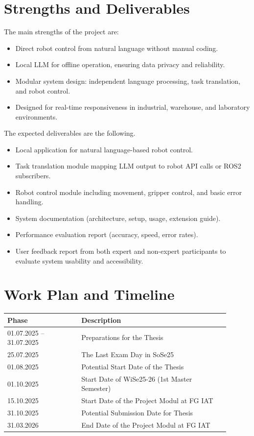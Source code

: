\documentclass[a4paper,11pt]{article}
\begin{document}
\newpage
\section{Strengths and Deliverables}

The main strengths of the project are:

\begin{itemize}
    \item Direct robot control from natural language without manual coding.
    \item Local LLM for offline operation, ensuring data privacy and reliability.
    \item Modular system design: independent language processing, task translation, and robot control.
    \item Designed for real-time responsiveness in industrial, warehouse, and laboratory environments.
\end{itemize}

The expected deliverables are the following.

\begin{itemize}
    \item Local application for natural language-based robot control.
    \item Task translation module mapping LLM output to robot API calls or ROS2 subscribers.
    \item Robot control module including movement, gripper control, and basic error handling.
    \item System documentation (architecture, setup, usage, extension guide).
    \item Performance evaluation report (accuracy, speed, error rates).
    \item User feedback report from both expert and non-expert participants to evaluate system usability and accessibility.

\end{itemize}

\section{Work Plan and Timeline}

\begin{tabular}{|p{0.3\linewidth}|p{0.6\linewidth}|}
\hline
\textbf{Phase} & \textbf{Description} \\
\hline
01.07.2025 – 31.07.2025 & Preparations for the Thesis \\
25.07.2025 & The Last Exam Day in SoSe25 \\
01.08.2025 & Potential Start Date of the Thesis \\
01.10.2025 & Start Date of WiSe25-26 (1st Master Semester) \\
15.10.2025 & Start Date of the Project Modul at FG IAT \\
31.10.2025 & Potential Submission Date for Thesis \\
31.03.2026 & End Date of the Project Modul at FG IAT \\
\hline
\end{tabular}
\end{document}

